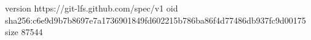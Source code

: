 version https://git-lfs.github.com/spec/v1
oid sha256:c6e9d9b7b8697e7a1736901849fd602215b786ba86f4d77486db937fc9d00175
size 87544
